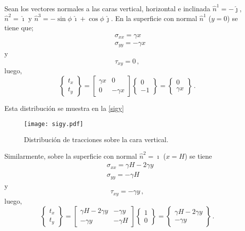 \documentclass[../notas medios.tex]{subfiles}
\begin{document}
Sean los vectores normales a las caras vertical, horizontal e inclinada $\hat{n}^1 =  - \hat \jmath$, ${{\hat n}^2} =   \hat \imath$ y $\hat{n}^3 =  - \sin\phi\, \hat \imath + \cos\phi\, \hat \jmath$. En la superficie con normal $\hat{n}^1$ ($y=0$) se tiene que;
\begin{align*}
  &\sigma_{xx} = \gamma x\\
  &\sigma_{yy} =  -\gamma x
\end{align*}
y
\[\tau_{xy} = 0\, , \]
luego,
\[\begin{Bmatrix}
t_x\\
t_y
\end{Bmatrix} = \begin{bmatrix}
\gamma x &0\\
0 & -\gamma x
\end{bmatrix}
\begin{Bmatrix}
0\\
-1
\end{Bmatrix} = \begin{Bmatrix}
0\\
\gamma x
\end{Bmatrix}\, .\]

Esta distribución se muestra en la \cref{sigy}
\begin{figure}[H]
\centering
	\texttt{[image: sigy.pdf]}
	\caption{Distribución de tracciones sobre la cara vertical.}
	\label{sigx}
\end{figure}


Similarmente, sobre la superficie con normal $\hat{n}^2 =   \hat\imath$ ($x=H$) se tiene
\begin{align*}
&\sigma_{xx} = \gamma H - 2\gamma y\\
&\sigma_{yy} =  -\gamma H
\end{align*}
y
\[\tau_{xy} =  - \gamma y\, ,\]
luego,
\[\begin{Bmatrix}
t_x\\
t_y
\end{Bmatrix} = \begin{bmatrix}
\gamma H - 2\gamma y &-\gamma y\\
 -\gamma y &-\gamma H
\end{bmatrix} \begin{Bmatrix}
1\\
0
\end{Bmatrix} = \begin{Bmatrix}
\gamma H - 2\gamma y\\
-\gamma y
\end{Bmatrix}\, .\]
\end{document}
